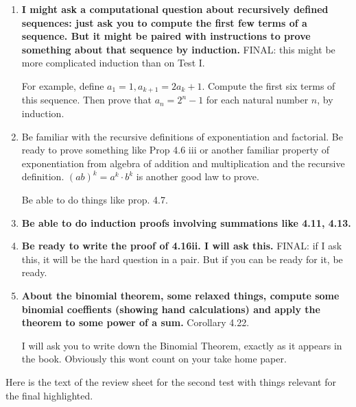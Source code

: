 \documentclass[12pt]{article}
\begin{document}
\begin{enumerate}
{\bf Something like project 3.7 (negations of logically connected and quantified statements) can be expected.}  FINAL:  I am thinking of asking you to say what it means for a limit statement to be false.  That will apply this.

\item  {\bf I might ask a computational question about recursively defined sequences:  just ask you to compute the first few terms of a sequence.
But it might be paired with instructions to prove something about that sequence by induction.}  FINAL:  this might be more complicated induction than on Test I.

For example, define $a_1 = 1, a_{k+1} = 2a_k+1$.  Compute the first six terms of this sequence.  Then prove that $a_n = 2^n-1$ for each natural number $n$, by induction.

\item  Be familiar with the recursive definitions of exponentiation and factorial.  Be ready to prove something like Prop 4.6 iii or another familiar property of exponentiation from algebra of addition and multiplication and the recursive definition.  $(ab)^k = a^k\cdot b^k$ is another good law to prove.

Be able to do things like prop. 4.7.

\item  {\bf Be able to do induction proofs involving summations like 4.11, 4.13.}

\item  {\bf Be ready to write the proof of 4.16ii.  I will ask this.}  FINAL:  if I ask this, it will be the hard question in a pair.  But if you can be ready for it, be ready.

\item  {\bf About the binomial theorem, some relaxed things, compute some binomial coeffients (showing hand calculations) and apply the theorem to some power of a sum.}
Corollary 4.22.

I will ask you to write down the Binomial Theorem, exactly as it appears in the book.  Obviously this wont count on your take home paper.

\end{enumerate}

Here is the text of the review sheet for the second test with things relevant for the final highlighted.
\end{document}
